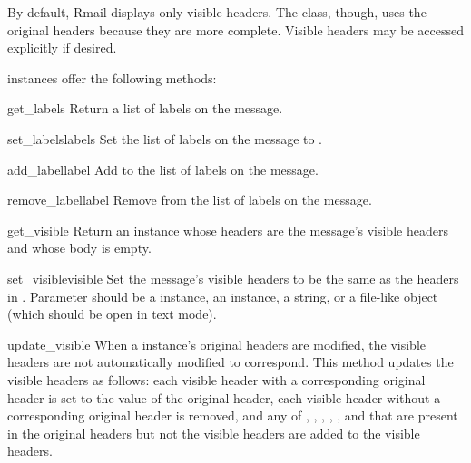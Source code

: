 By default, Rmail displays only
visible headers. The  class, though, uses the original
headers because they are more complete. Visible headers may be accessed
explicitly if desired.

 instances offer the following methods:

\begin{methoddesc}{get_labels}{}
Return a list of labels on the message.
\end{methoddesc}

\begin{methoddesc}{set_labels}{labels}
Set the list of labels on the message to .
\end{methoddesc}

\begin{methoddesc}{add_label}{label}
Add  to the list of labels on the message.
\end{methoddesc}

\begin{methoddesc}{remove_label}{label}
Remove  from the list of labels on the message.
\end{methoddesc}

\begin{methoddesc}{get_visible}{}
Return an  instance whose headers are the message's visible
headers and whose body is empty.
\end{methoddesc}

\begin{methoddesc}{set_visible}{visible}
Set the message's visible headers to be the same as the headers in
. Parameter  should be a  instance, an
 instance, a string, or a file-like object (which
should be open in text mode).
\end{methoddesc}

\begin{methoddesc}{update_visible}{}
When a  instance's original headers are modified, the
visible headers are not automatically modified to correspond. This method
updates the visible headers as follows: each visible header with a
corresponding original header is set to the value of the original header, each
visible header without a corresponding original header is removed, and any of
, , , ,
, and  that are present in the original
headers but not the visible headers are added to the visible headers.
\end{methoddesc}

